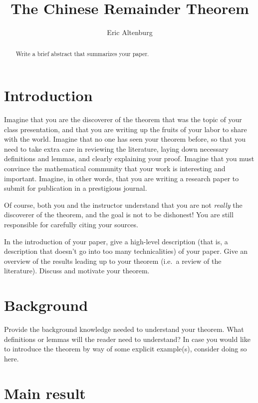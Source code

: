 \documentclass[12pt,a4paper,reqno,parskip=full]{amsart}
\numberwithin{equation}{section}
\theoremstyle{plain}
\theoremstyle{definition}
\begin{document}
\title{The Chinese Remainder Theorem}

\author{Eric Altenburg}

\begin{abstract}
Write a brief abstract that summarizes your paper.
\end{abstract}

\maketitle



\section{Introduction}

Imagine that you are the discoverer of the theorem that was the topic of your class presentation, and that you are writing up the fruits of your labor to share with the world. Imagine that no one has seen your theorem before, so that you need to take extra care in reviewing the literature, laying down necessary definitions and lemmas, and clearly explaining your proof. Imagine that you must convince the mathematical community that your work is interesting and important. Imagine, in other words, that you are writing a research paper to submit for publication in a prestigious journal.

Of course, both you and the instructor understand that you are not \emph{really} the discoverer of the theorem, and the goal is not to be dishonest! You are still responsible for carefully citing your sources.

In the introduction of your paper, give a high-level description (that is, a description that doesn't go into too many technicalities) of your paper. Give an overview of the results leading up to your theorem (i.e.\ a review of the literature). Discuss and motivate your theorem.

\section{Background}

Provide the background knowledge needed to understand your theorem. What definitions or lemmas will the reader need to understand? In case you would like to introduce the theorem by way of some explicit example(s), consider doing so here.

\section{Main result}
\end{document}

